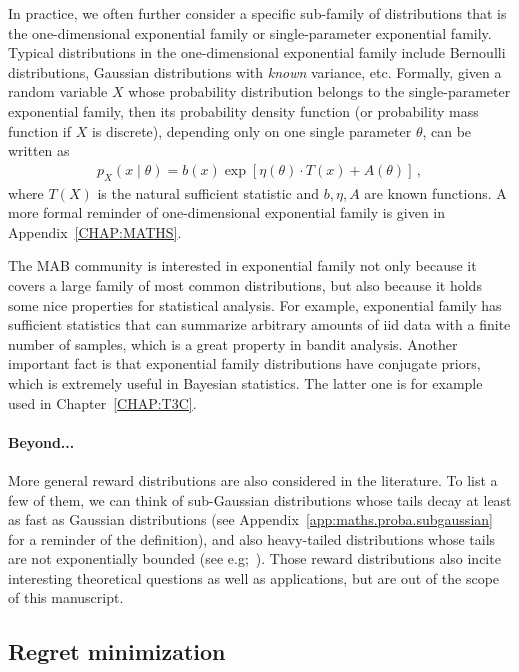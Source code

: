 In practice, we often further consider a specific sub-family of distributions that is the \gls{one-dimensional exponential family} or \gls{single-parameter exponential family}. Typical distributions in the one-dimensional exponential family include Bernoulli distributions, Gaussian distributions with \emph{known} variance, etc. Formally, given a random variable $X$ whose probability distribution belongs to the single-parameter exponential family, then its \gls{probability density function} (or \gls{probability mass function} if $X$ is discrete), depending only on one single parameter $\theta$, can be written as
\begin{align}\label{eq:mab.exponential}
    p_{X}(x \mid \theta ) = b(x) \exp \left[\eta (\theta ) \cdot T(x) + A(\theta )\right]\,,
\end{align}
where $T(X)$ is the \gls{natural sufficient statistic} and $b,\eta,A$ are known functions. A more formal reminder of one-dimensional exponential family is given in Appendix~\ref{CHAP:MATHS}.

The MAB community is interested in exponential family not only because it covers a large family of most common distributions, but also because it holds some nice properties for statistical analysis. For example, exponential family has sufficient statistics that can summarize arbitrary amounts of \gls{iid} data with a finite number of samples, which is a great property in bandit analysis. Another important fact is that exponential family distributions have conjugate priors, which is extremely useful in Bayesian statistics. The latter one is for example used in Chapter~\ref{CHAP:T3C}.

\paragraph{Beyond...}

More general reward distributions are also considered in the literature. To list a few of them, we can think of sub-Gaussian distributions whose tails decay at least as fast as Gaussian distributions (see Appendix~\ref{app:maths.proba.subgaussian} for a reminder of the definition), and also heavy-tailed distributions whose tails are not exponentially bounded (see e.g;~\citealt{bubeck2011heavy,yu2018heavy}). Those reward distributions also incite interesting theoretical questions as well as applications, but are out of the scope of this manuscript.

\subsection{Regret minimization}\label{sec:mab.model.regret}

